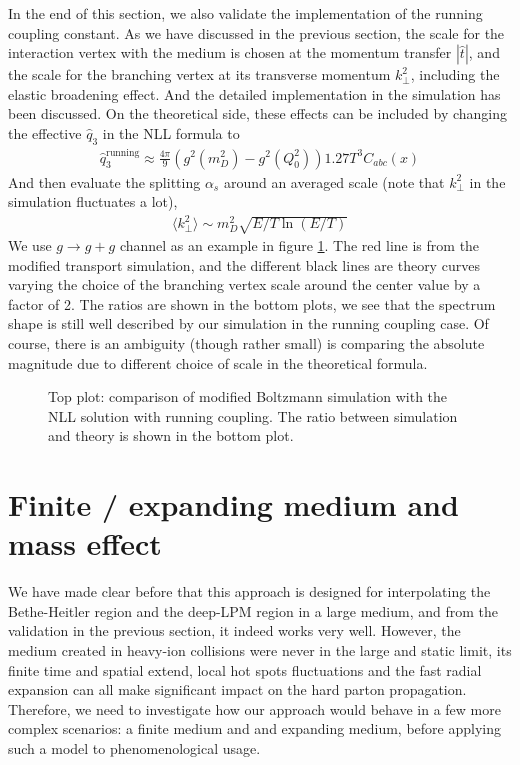 In the end of this section, we also validate the implementation of the running coupling constant.
As we have discussed in the previous section, the scale for the interaction vertex with the medium is chosen at the momentum transfer $|\hat{t}|$, and the scale for the branching vertex at its transverse momentum $k_\perp^2$, including the elastic broadening effect.
And the detailed implementation in the simulation has been discussed.
On the theoretical side, these effects can be included by changing the effective $\hat{q}_3$ in the NLL formula to 
\begin{eqnarray}
\hat{q}_3^{\textrm{running}} \approx \frac{4\pi}{9}\left(g^2(m_D^2) - g^2(Q_0^2)\right) 1.27 T^3 C_{abc}(x)
\label{eq:q3running}
\end{eqnarray}
And then evaluate the splitting $\alpha_s$ around an averaged scale (note that $k_\perp^2$ in the simulation fluctuates a lot),
\begin{eqnarray}
\langle k_\perp^2\rangle \sim m_D^2 \sqrt{E/T\ln(E/T)}
\end{eqnarray}  
We use $g\rightarrow g+g$ channel as an example in figure \ref{fig:running}.
The red line is from the modified transport simulation, and the different black lines are theory curves varying the choice of the branching vertex scale around the center value by a factor of 2.
The ratios are shown in the bottom plots, we see that the spectrum shape is still well described by our simulation in the running coupling case. 
Of course, there is an ambiguity (though rather small) is comparing the absolute magnitude due to different choice of scale in the theoretical formula.

\begin{figure}
\caption{Top plot: comparison of modified Boltzmann simulation with the NLL solution  with running coupling.
The ratio between simulation and theory is shown in the bottom plot.}
\label{fig:running}
\end{figure}


\section{Finite / expanding medium and mass effect}
We have made clear before that this approach is designed for interpolating the Bethe-Heitler region and the deep-LPM region in a large medium, and from the validation in the previous section, it indeed works very well.
However, the medium created in heavy-ion collisions were never in the large and static limit, its finite time and spatial extend, local hot spots fluctuations and the fast radial expansion can all make significant impact on the hard parton propagation. 
Therefore, we need to investigate how our approach would behave in a few more complex scenarios: a finite medium and and expanding medium, before applying such a model to phenomenological usage.

